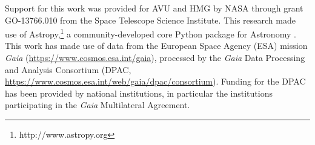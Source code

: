 \documentclass[twocolumn]{aastex62}
\begin{document}
\acknowledgments
Support for this work was provided for AVU and HMG by NASA through
grant GO-13766.010 from the Space Telescope Science Institute. This research made use of Astropy,\footnote{http://www.astropy.org} a community-developed core Python package for Astronomy \citep{2013A&A...558A..33A,2018AJ....156..123A}. 
This work has made use of data from the European Space Agency (ESA) mission
{\it Gaia} (\url{https://www.cosmos.esa.int/gaia}), processed by the {\it Gaia}
Data Processing and Analysis Consortium (DPAC,
\url{https://www.cosmos.esa.int/web/gaia/dpac/consortium}). Funding for the DPAC
has been provided by national institutions, in particular the institutions
participating in the {\it Gaia} Multilateral Agreement.





\end{document}
